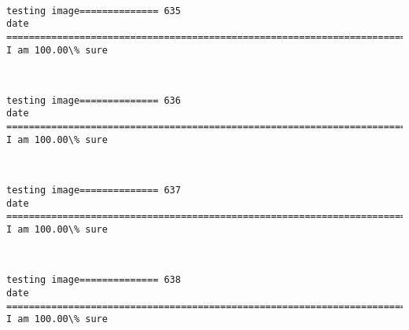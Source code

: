 \documentclass[11pt]{article}
\begin{document}
    \begin{center}
    \end{center}
    { \hspace*{\fill} \\}
    
    \begin{Verbatim}[commandchars=\\\{\}]
testing image============== 635
date
============================================================================
I am 100.00\% sure

    \end{Verbatim}

    \begin{center}
    \end{center}
    { \hspace*{\fill} \\}
    
    \begin{Verbatim}[commandchars=\\\{\}]
testing image============== 636
date
============================================================================
I am 100.00\% sure

    \end{Verbatim}

    \begin{center}
    \end{center}
    { \hspace*{\fill} \\}
    
    \begin{Verbatim}[commandchars=\\\{\}]
testing image============== 637
date
============================================================================
I am 100.00\% sure

    \end{Verbatim}

    \begin{center}
    \end{center}
    { \hspace*{\fill} \\}
    
    \begin{Verbatim}[commandchars=\\\{\}]
testing image============== 638
date
============================================================================
I am 100.00\% sure

    \end{Verbatim}
\end{document}
